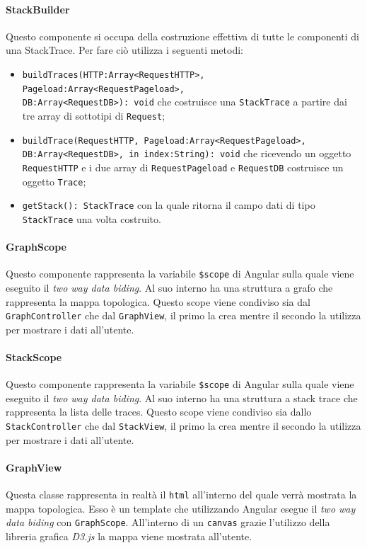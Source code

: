 \paragraph{StackBuilder} \Spazio
Questo componente si occupa della costruzione effettiva di tutte le componenti di una StackTrace. Per fare ciò utilizza i seguenti metodi:
\begin{itemize}
	\item \texttt{buildTraces(HTTP:Array<RequestHTTP>, Pageload:Array<RequestPageload>,\\ DB:Array<RequestDB>): void} che costruisce una \texttt{StackTrace} a partire dai tre array di sottotipi di \texttt{Request};
	\item \texttt{buildTrace(RequestHTTP, Pageload:Array<RequestPageload>,\\ DB:Array<RequestDB>, in index:String): void} che ricevendo un oggetto\\ \texttt{RequestHTTP} e i due array di \texttt{RequestPageload} e \texttt{RequestDB} costruisce un oggetto \texttt{Trace};
	\item \texttt{getStack(): StackTrace} con la quale ritorna il campo dati di tipo \texttt{StackTrace} una volta costruito.
\end{itemize}

\paragraph{GraphScope} \Spazio
Questo componente rappresenta la variabile \texttt{\$scope} di Angular sulla quale viene eseguito il \emph{two way data biding}. Al suo interno ha una struttura a grafo che rappresenta la mappa topologica. Questo scope viene condiviso sia dal \texttt{GraphController} che dal \texttt{GraphView}, il primo la crea mentre il secondo la utilizza per mostrare i dati all'utente.

\paragraph{StackScope} \Spazio
Questo componente rappresenta la variabile \texttt{\$scope} di Angular sulla quale viene eseguito il \emph{two way data biding}. Al suo interno ha una struttura a stack trace che rappresenta la lista delle traces. Questo scope viene condiviso sia dallo \texttt{StackController} che dal \texttt{StackView}, il primo la crea mentre il secondo la utilizza per mostrare i dati all'utente.

\paragraph{GraphView} \Spazio
Questa classe rappresenta in realtà il  \texttt{html} all'interno del quale verrà mostrata la mappa topologica. Esso è un template che utilizzando Angular esegue il \emph{two way data biding} con \texttt{GraphScope}. All'interno di un \texttt{canvas} grazie l'utilizzo della libreria grafica \emph{D3.js} la mappa viene mostrata all'utente.


